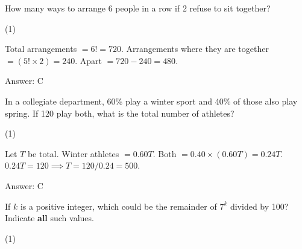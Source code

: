 \documentclass[11pt,paper=a4,answers]{exam}
\begin{document}
\begin{questions}
\vspace{1cm}

\question
How many ways to arrange 6 people in a row if 2 refuse to sit together?

\begin{tasks}(1)
    
\end{tasks}

\begin{solution}
\begin{center}
Total arrangements $= 6! = 720$.
\vspace{5pt}
Arrangements where they are together $= (5! \times 2) = 240$.
\vspace{5pt}
Apart $= 720 - 240 = 480$.
\end{center}

Answer: \colorbox{yellow!100}{C}
\end{solution}

\vspace{1cm}

\question
In a collegiate department, 60\% play a winter sport and 40\% of those also play spring. If 120 play both, what is the total number of athletes?

\begin{tasks}(1)
    
\end{tasks}

\begin{solution}
\begin{center}
Let $T$ be total. Winter athletes $= 0.60T$.
\vspace{5pt}
Both $= 0.40 \times (0.60T) = 0.24T$.
\vspace{5pt}
$0.24T = 120 \implies T = 120 / 0.24 = 500$.
\end{center}

Answer: \colorbox{yellow!100}{C}
\end{solution}

\vspace{1cm}


\question
If $k$ is a positive integer, which could be the remainder of $7^k$ divided by 100?
Indicate \textbf{all} such values.

\begin{tasks}(1)
   
\end{tasks}


\end{questions}
\end{document}

